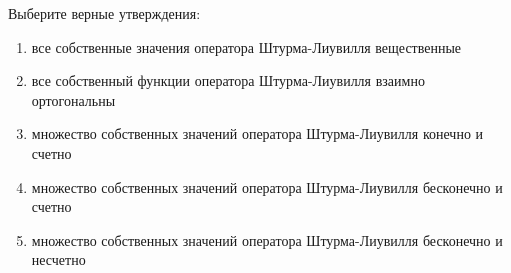 Выберите верные утверждения:

\begin{enumerate}[label=\arabic*)]
    \item все собственные значения оператора Штурма-Лиувилля вещественные
    \item все собственный функции оператора Штурма-Лиувилля взаимно ортогональны
    \item множество собственных значений оператора Штурма-Лиувилля конечно и счетно
    \item множество собственных значений оператора Штурма-Лиувилля бесконечно и счетно
    \item множество собственных значений оператора Штурма-Лиувилля бесконечно и несчетно
\end{enumerate}

